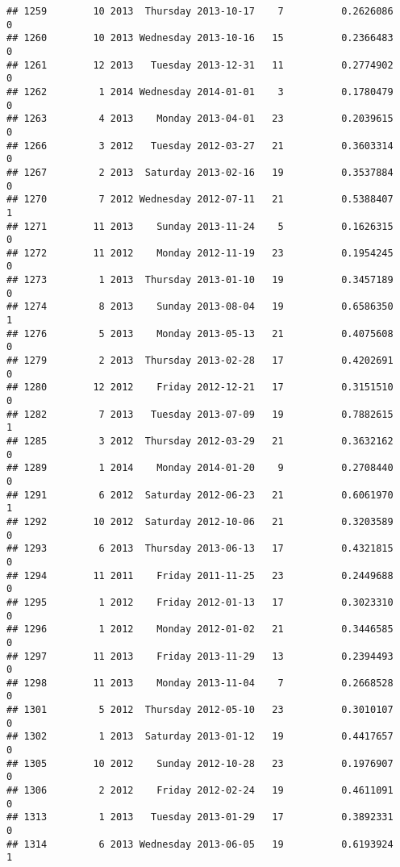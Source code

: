 \documentclass[
]{article}
\begin{document}
\begin{verbatim}
## 1259        10 2013  Thursday 2013-10-17    7          0.2626086             0
## 1260        10 2013 Wednesday 2013-10-16   15          0.2366483             0
## 1261        12 2013   Tuesday 2013-12-31   11          0.2774902             0
## 1262         1 2014 Wednesday 2014-01-01    3          0.1780479             0
## 1263         4 2013    Monday 2013-04-01   23          0.2039615             0
## 1266         3 2012   Tuesday 2012-03-27   21          0.3603314             0
## 1267         2 2013  Saturday 2013-02-16   19          0.3537884             0
## 1270         7 2012 Wednesday 2012-07-11   21          0.5388407             1
## 1271        11 2013    Sunday 2013-11-24    5          0.1626315             0
## 1272        11 2012    Monday 2012-11-19   23          0.1954245             0
## 1273         1 2013  Thursday 2013-01-10   19          0.3457189             0
## 1274         8 2013    Sunday 2013-08-04   19          0.6586350             1
## 1276         5 2013    Monday 2013-05-13   21          0.4075608             0
## 1279         2 2013  Thursday 2013-02-28   17          0.4202691             0
## 1280        12 2012    Friday 2012-12-21   17          0.3151510             0
## 1282         7 2013   Tuesday 2013-07-09   19          0.7882615             1
## 1285         3 2012  Thursday 2012-03-29   21          0.3632162             0
## 1289         1 2014    Monday 2014-01-20    9          0.2708440             0
## 1291         6 2012  Saturday 2012-06-23   21          0.6061970             1
## 1292        10 2012  Saturday 2012-10-06   21          0.3203589             0
## 1293         6 2013  Thursday 2013-06-13   17          0.4321815             0
## 1294        11 2011    Friday 2011-11-25   23          0.2449688             0
## 1295         1 2012    Friday 2012-01-13   17          0.3023310             0
## 1296         1 2012    Monday 2012-01-02   21          0.3446585             0
## 1297        11 2013    Friday 2013-11-29   13          0.2394493             0
## 1298        11 2013    Monday 2013-11-04    7          0.2668528             0
## 1301         5 2012  Thursday 2012-05-10   23          0.3010107             0
## 1302         1 2013  Saturday 2013-01-12   19          0.4417657             0
## 1305        10 2012    Sunday 2012-10-28   23          0.1976907             0
## 1306         2 2012    Friday 2012-02-24   19          0.4611091             0
## 1313         1 2013   Tuesday 2013-01-29   17          0.3892331             0
## 1314         6 2013 Wednesday 2013-06-05   19          0.6193924             1

\end{verbatim}
\end{document}
